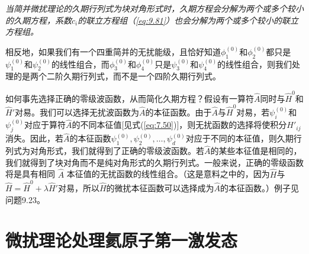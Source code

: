     \textit{ 当简并微扰理论的久期行列式为块对角形式时，久期方程会分解为两个或多个较小的久期方程，系数$c_i$的联立方程组（\ref{eq:9.81}）也会分解为两个或多个较小的联立方程组。}

    相反地，如果我们有一个四重简并的无扰能级，且恰好知道$\phi_1^{\left(0\right)}$和$\phi_2^{\left(0\right)}$都只是$\psi_1^{\left(0\right)}$和$\psi_2^{\left(0\right)}$的线性组合，而$\phi_3^{\left(0\right)}$和$\phi_4^{\left(0\right)}$只是$\psi_3^{\left(0\right)}$和$\psi_4^{\left(0\right)}$的线性组合，则我们处理的是两个二阶久期行列式，而不是一个四阶久期行列式。

    如何事先选择正确的零级波函数，从而简化久期方程？假设有一算符$\hat{A}$同时与$\hat{H}^0$和$\hat{H}'$对易。我们可以选择无扰波函数为$\hat{A}$的本征函数。由于$\hat{A}$与$\hat{H}^0$对易，若$\psi_i^{\left(0\right)}$和$\psi_j^{\left(0\right)}$对应于算符$\hat{A}$的不同本征值[见式(\ref{eq:7.50})]，则无扰函数的选择将使积分$H'_{ij}$消失。因此，若$\hat{A}$的本征函数$\psi_1^{\left(0\right)}, \psi_2^{\left(0\right)}, \ldots, \psi_d^{\left(0\right)}$对应于不同的本征值，则久期行列式为对角形式，我们就得到了正确的零级波函数。若$\hat{A}$的某些本征值是相同的，我们就得到了块对角而不是纯对角形式的久期行列式。一般来说，正确的零级函数将是具有相同 $\hat{A}$ 本征值的无扰函数的线性组合。（这是意料之中的，因为$\hat{H}$与$\hat{H} = \hat{H}^0 + \lambda\hat{H}'$对易，所以$\hat{H}$的微扰本征函数可以选择成为$\hat{A}$的本征函数。）例子见问题9.23。

\section{微扰理论处理氦原子第一激发态}
\label{sec:9.7 Perturbation Treatment of the First Excited State of Helium}

